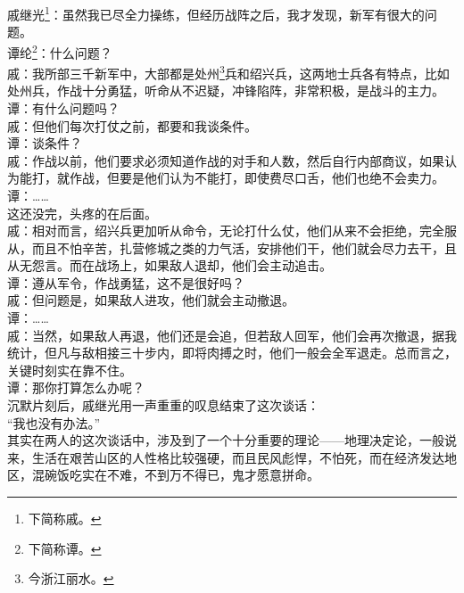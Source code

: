 \begin{multicols}{\theparacolNo}
戚继光\footnote{下简称戚。}：虽然我已尽全力操练，但经历战阵之后，我才发现，新军有很大的问题。\\

谭纶\footnote{下简称谭。}：什么问题？\\

戚：我所部三千新军中，大部都是处州\footnote{今浙江丽水。}兵和绍兴兵，这两地士兵各有特点，比如处州兵，作战十分勇猛，听命从不迟疑，冲锋陷阵，非常积极，是战斗的主力。\\

谭：有什么问题吗？\\

戚：但他们每次打仗之前，都要和我谈条件。\\

谭：谈条件？\\

戚：作战以前，他们要求必须知道作战的对手和人数，然后自行内部商议，如果认为能打，就作战，但要是他们认为不能打，即使费尽口舌，他们也绝不会卖力。\\

谭：……\\

这还没完，头疼的在后面。\\

戚：相对而言，绍兴兵更加听从命令，无论打什么仗，他们从来不会拒绝，完全服从，而且不怕辛苦，扎营修城之类的力气活，安排他们干，他们就会尽力去干，且从无怨言。而在战场上，如果敌人退却，他们会主动追击。\\

谭：遵从军令，作战勇猛，这不是很好吗？\\

戚：但问题是，如果敌人进攻，他们就会主动撤退。\\

谭：……\\

戚：当然，如果敌人再退，他们还是会追，但若敌人回军，他们会再次撤退，据我统计，但凡与敌相接三十步内，即将肉搏之时，他们一般会全军退走。总而言之，关键时刻实在靠不住。\\

谭：那你打算怎么办呢？\\

沉默片刻后，戚继光用一声重重的叹息结束了这次谈话：\\

“我也没有办法。”\\

其实在两人的这次谈话中，涉及到了一个十分重要的理论——地理决定论，一般说来，生活在艰苦山区的人性格比较强硬，而且民风彪悍，不怕死，而在经济发达地区，混碗饭吃实在不难，不到万不得已，鬼才愿意拼命。\\


\end{multicols}
